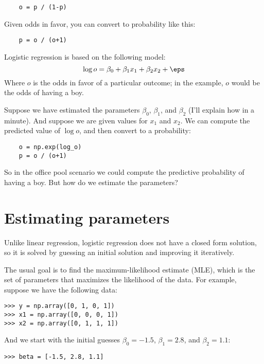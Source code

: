 \begin{verbatim}
    o = p / (1-p)
\end{verbatim}

Given odds in favor, you can convert to
probability like this:

\begin{verbatim}
    p = o / (o+1)
\end{verbatim}

Logistic regression is based on the following model:
%
\[ \log o = \beta_0 + \beta_1 x_1 + \beta_2 x_2 + \eps \]
%
Where $o$ is the odds in favor of a particular outcome; in the
example, $o$ would be the odds of having a boy.

Suppose we have estimated the parameters $\beta_0$, $\beta_1$, and
$\beta_2$ (I'll explain how in a minute).  And suppose we are given
values for $x_1$ and $x_2$.  We can compute the predicted value of
$\log o$, and then convert to a probability:

\begin{verbatim}
    o = np.exp(log_o)
    p = o / (o+1)
\end{verbatim}

So in the office pool scenario we could compute the predictive
probability of having a boy.  But how do we estimate the parameters?


\section{Estimating parameters}

Unlike linear regression, logistic regression does not have a
closed form solution, so it is solved by guessing an initial
solution and improving it iteratively.

The usual goal is to find the maximum-likelihood estimate (MLE),
which is the set of parameters that maximizes the likelihood of the
data.  For example, suppose we have the following data:

\begin{verbatim}
>>> y = np.array([0, 1, 0, 1])
>>> x1 = np.array([0, 0, 0, 1])
>>> x2 = np.array([0, 1, 1, 1])
\end{verbatim}

And we start with the initial guesses $\beta_0=-1.5$, $\beta_1=2.8$,
and $\beta_2=1.1$:

\begin{verbatim}
>>> beta = [-1.5, 2.8, 1.1]
\end{verbatim}

